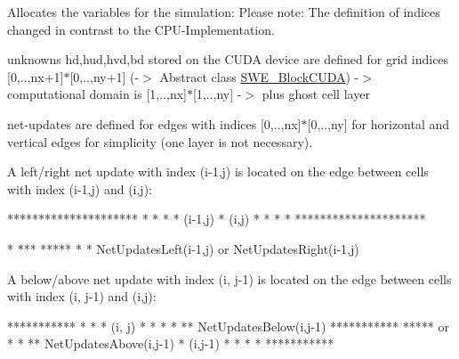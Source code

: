 Allocates the variables for the simulation\-: Please note\-: The definition of indices changed in contrast to the C\-P\-U-\/\-Implementation.

unknowns hd,hud,hvd,bd stored on the C\-U\-D\-A device are defined for grid indices \mbox{[}0,..,nx+1\mbox{]}$\ast$\mbox{[}0,..,ny+1\mbox{]} (-\/$>$ Abstract class \hyperlink{classSWE__BlockCUDA}{S\-W\-E\-\_\-\-Block\-C\-U\-D\-A}) -\/$>$ computational domain is \mbox{[}1,..,nx\mbox{]}$\ast$\mbox{[}1,..,ny\mbox{]} -\/$>$ plus ghost cell layer

net-\/updates are defined for edges with indices \mbox{[}0,..,nx\mbox{]}$\ast$\mbox{[}0,..,ny\mbox{]} for horizontal and vertical edges for simplicity (one layer is not necessary).

A left/right net update with index (i-\/1,j) is located on the edge between cells with index (i-\/1,j) and (i,j)\-: 
\begin{DoxyPre}
  *********************
  *         *         *
  * (i-1,j) *  (i,j)  *
  *         *         *
  *********************\end{DoxyPre}



\begin{DoxyPre}            *
           ***
          *****
            *
            *
  NetUpdatesLeft(i-1,j)
            or
  NetUpdatesRight(i-1,j)
\end{DoxyPre}


A below/above net update with index (i, j-\/1) is located on the edge between cells with index (i, j-\/1) and (i,j)\-: 
\begin{DoxyPre}
  ***********
  *         *
  * (i, j)  *   *
  *         *  **  NetUpdatesBelow(i,j-1)
  *********** *****         or
  *         *  **  NetUpdatesAbove(i,j-1)
  * (i,j-1) *   *
  *         *
  ***********
\end{DoxyPre}
 
